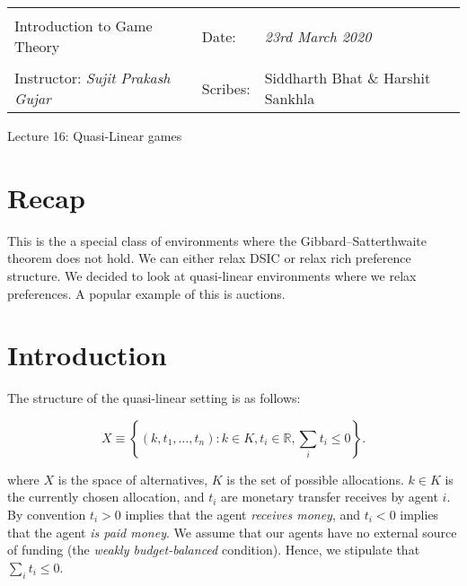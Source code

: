 \documentclass[10pt,a4paper]{article}
\newcommand{\R}{\ensuremath{\mathbb R}}
\begin{document}
\begin{table}[!h]
\centering
\begin{tabularx}{\textwidth}{|Xll|}
\hline
& &\\
Introduction to Game Theory &  Date: & \emph{23rd March 2020}\\
 & &\\
Instructor: \emph{Sujit Prakash Gujar} & Scribes: & {Siddharth Bhat \& Harshit Sankhla} \\ 
 \hline

\end{tabularx}
\end{table}

\begin{center}
\begin{LARGE}
Lecture 16: Quasi-Linear games
\end{LARGE}
\end{center}

\section{Recap}
This is the a special class of environments where the Gibbard–Satterthwaite
theorem does not hold.  We can either relax DSIC or relax rich preference structure. We decided
to look at quasi-linear environments where we relax preferences. A popular
example of this is auctions.

\section{Introduction}
The structure of the quasi-linear setting is as follows:

\begin{equation}
X \equiv \left\{ (k, t_1, \dots, t_n) : k \in K, t_i \in \R, \sum_i t_i \leq 0 \right\}.
\end{equation}


where $X$ is the space of alternatives, $K$ is the set of possible allocations.
$k \in K$ is the currently chosen allocation, and $t_i$ are monetary transfer receives by agent $i$.
By convention $t_i > 0$ implies that the agent \emph{receives money}, and
$t_i < 0$ implies that the agent \emph{is paid money}. We assume that our
agents have no external source of funding (the \emph{weakly budget-balanced}
condition). Hence, we stipulate that $\sum_i t_i \leq 0$.
\end{document}
